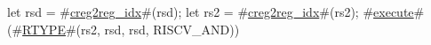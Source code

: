 let rsd = #\hyperref[sailRISCVzcreg2regzyidx]{creg2reg\_idx}#(rsd);
let rs2 = #\hyperref[sailRISCVzcreg2regzyidx]{creg2reg\_idx}#(rs2);
#\hyperref[sailRISCVzexecute]{execute}#(#\hyperref[sailRISCVzRTYPE]{RTYPE}#(rs2, rsd, rsd, RISCV_AND))
